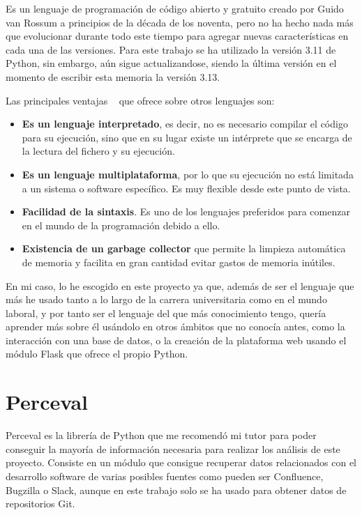 \documentclass[a4paper, 12pt]{book}
\begin{document}
Es un lenguaje de programación de código abierto y gratuito creado por Guido van Rossum a principios de la década de los noventa, pero no ha hecho nada más que evolucionar durante todo este tiempo para agregar nuevas características en cada una de las versiones. Para este trabajo se ha utilizado la versión 3.11 de Python, sin embargo, aún sigue actualizandose, siendo la última versión en el momento de escribir esta memoria la versión 3.13.

Las principales ventajas ~\cite{fernandez:_python} que ofrece sobre otros lenguajes son:

\begin{itemize}
  \item \textbf{Es un lenguaje interpretado}, es decir, no es necesario compilar el código para su ejecución, sino que en su lugar existe un intérprete que se encarga de la lectura del fichero y su ejecución.
  \item \textbf{Es un lenguaje multiplataforma}, por lo que su ejecución no está limitada a un sistema o software específico. Es muy flexible desde este punto de vista.
  \item \textbf{Facilidad de la sintaxis}. Es uno de los lenguajes preferidos para comenzar en el mundo de la programación debido a ello.
  \item \textbf{Existencia de un garbage collector} que permite la limpieza automática de memoria y facilita en gran cantidad evitar gastos de memoria inútiles.
\end{itemize}

En mi caso, lo he escogido en este proyecto ya que, además de ser el lenguaje que más he usado tanto a lo largo de la carrera universitaria como en el mundo laboral, y por tanto ser el lenguaje del que más conocimiento tengo, quería aprender más sobre él usándolo en otros ámbitos que no conocía antes, como la interacción con una base de datos, o la creación de la plataforma web usando el módulo Flask que ofrece el propio Python.

\section{Perceval}
\label{sec:Perceval}
Perceval es la librería de Python que me recomendó mi tutor para poder conseguir la mayoría de información necesaria para realizar los análisis de este proyecto. Consiste en un módulo que consigue recuperar datos relacionados con el desarrollo software de varias posibles fuentes como pueden ser Confluence, Bugzilla o Slack, aunque en este trabajo solo se ha usado para obtener datos de repositorios Git.
\end{document}
